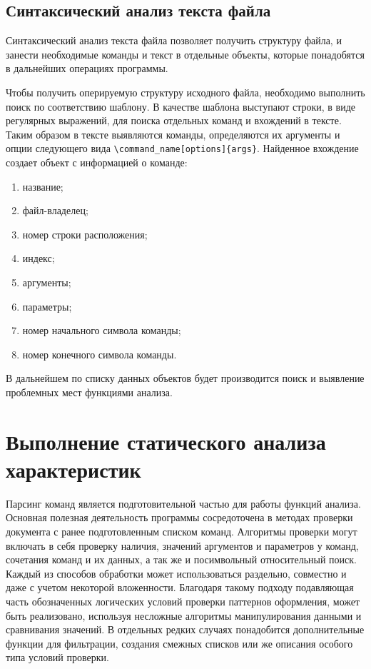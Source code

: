 \subsection{Синтаксический анализ текста файла}

Синтаксический анализ текста файла позволяет получить структуру файла, и занести необходимые команды и текст в отдельные объекты, которые понадобятся в дальнейших операциях программы. 

Чтобы получить оперируемую структуру исходного файла, необходимо выполнить поиск по соответствию шаблону. В качестве шаблона выступают строки, в виде регулярных выражений, для поиска отдельных команд и вхождений в тексте. Таким образом в тексте выявляются команды, определяются их аргументы и опции следующего вида \verb|\command_name[options]{args}|. Найденное вхождение создает объект с информацией о команде: 

\begin{enumerate}
    \item название;
    \item файл-владелец;
    \item номер строки расположения;
    \item индекс;
    \item аргументы;
    \item параметры;
    \item номер начального символа команды;
    \item номер конечного символа команды.

\end{enumerate}

В дальнейшем по списку данных объектов будет производится поиск и выявление проблемных мест функциями анализа.

\section{Выполнение статического анализа характеристик}
    Парсинг команд является подготовительной частью для работы функций анализа. Основная полезная деятельность программы сосредоточена в методах проверки документа с ранее подготовленным списком команд. Алгоритмы проверки могут включать в себя проверку наличия, значений аргументов и параметров у команд, сочетания команд и их данных, а так же и посимвольный относительный поиск. Каждый из способов обработки может использоваться раздельно, совместно и даже с учетом некоторой вложенности. Благодаря такому подходу подавляющая часть обозначенных логических условий проверки паттернов оформления, может быть реализовано, используя несложные алгоритмы манипулирования данными и сравнивания значений. В отдельных редких случаях понадобится дополнительные функции для фильтрации, создания смежных списков или же описания особого типа условий проверки.

